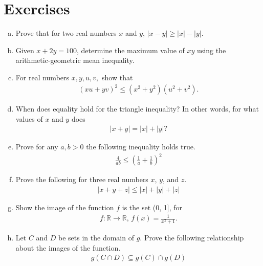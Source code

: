 \section{Exercises}

\begin{enumerate}[(a)]
	\setlength\itemsep{\baselineskip}
	\item  Prove that for two real numbers $x$ and $y$, $|x - y| \ge |x| - |y|$.
	
	\item Given $x + 2y = 100$, determine the maximum value of $xy$ using the arithmetic-geometric mean inequality.
	
	\item For real numbers $x, y, u, v,$ show that 
	\begin{align*}
		(xu + yv)^2 \le (x^2 + y^2)(u^2 + v^2).
	\end{align*}

	\item When does equality hold for the triangle inequality? In other words, for what values of $x$ and $y$ does 
	\begin{align*}
		|x + y| = |x| + |y|?
	\end{align*}

	\item Prove for any $a, b > 0$ the following inequality holds true.
	\begin{align*}
		\frac{4}{ab} \le \left( \frac{1}{a} + \frac{1}{b} \right)^2	
	\end{align*}

	\item Prove the following for three real numbers $x$, $y$, and $z$.
	\begin{align*}
		|x + y + z| \le |x| + |y| + |z|
	\end{align*}
	
	\item Show the image of the function $f$ is the set (0, 1], for
	\begin{align*}
		f: \mathbb{R} \rightarrow \mathbb{R}, \, f(x) = \frac{1}{x^2 + 1}.
	\end{align*}
	
	\item Let $C$ and $D$ be sets in the domain of $g$. Prove the following relationship about the images of the function.
	\begin{align*}
		g(C \cap D) \subseteq g(C) \cap g(D)
	\end{align*}
	

\end{enumerate}
